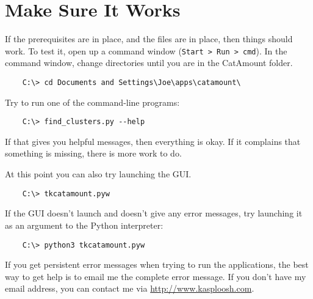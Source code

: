 \section{Make Sure It Works}

If the prerequisites are in place, and the files are in place, then things
should work. To test it, open up a command window (\verb=Start > Run > cmd=).
In the command window, change directories until you are in the CatAmount
folder.

\begin{verbatim}
    C:\> cd Documents and Settings\Joe\apps\catamount\
\end{verbatim}

Try to run one of the command-line programs:

\begin{verbatim}
    C:\> find_clusters.py --help
\end{verbatim}

If that gives you helpful messages, then everything is okay. If it complains
that something is missing, there is more work to do.

At this point you can also try launching the GUI.

\begin{verbatim}
    C:\> tkcatamount.pyw
\end{verbatim}

If the GUI doesn't launch and doesn't give any error messages, try launching
it as an argument to the Python interpreter:

\begin{verbatim}
    C:\> python3 tkcatamount.pyw
\end{verbatim}

If you get persistent error messages when trying to run the applications, the
best way to get help is to email me the complete error message. If you don't
have my email address, you can contact me via \url{http://www.kasploosh.com}.

